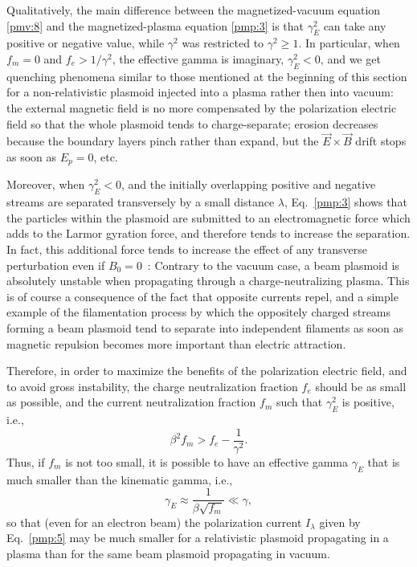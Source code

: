 \documentclass [12pt,a4paper,     ]{report} %
\begin{document}
   Qualitatively, the main difference between the magnetized-vacuum equation \eqref{pmv:8} and the magnetized-plasma equation \eqref{pmp:3} is that  $\gamma^2_E$ can take any positive or negative value, while $\gamma^2$ was restricted to $\gamma^2 \geq 1$.  In particular, when $f_m=0$ and $f_e > 1/\gamma^2$, the effective gamma is imaginary, $\gamma^2_E < 0$, and we get  quenching phenomena similar to those mentioned at the beginning of this section for a non-relativistic plasmoid injected into a plasma rather then into vacuum: the external magnetic field is no more compensated by the polarization electric field so that the whole plasmoid tends to charge-separate; erosion decreases because the boundary layers pinch rather than expand, but the $\vec E \times \vec B$ drift stops as soon as $E_p=0$, etc.


    Moreover, when $\gamma^2_E < 0$, and the initially overlapping positive and negative streams are separated transversely by a small distance $\lambda$, Eq.~\eqref{pmp:3} shows that the particles within the plasmoid are submitted to an electromagnetic force which adds to the Larmor gyration force, and therefore tends to increase the separation. In fact, this additional force tends to increase the effect of any transverse perturbation even if $B_0 = 0$~: Contrary to the vacuum case, a beam plasmoid is absolutely unstable when propagating through a charge-neutralizing plasma.  This is of course a consequence of the fact that opposite currents repel, and a simple example of the filamentation process by which the oppositely charged streams forming a beam plasmoid tend to separate into independent filaments as soon as magnetic repulsion becomes more important than electric attraction.


  Therefore, in order to maximize the benefits of the polarization electric field, and to avoid gross instability, the charge neutralization fraction $f_e$ should be as small as possible, and the current neutralization fraction $f_m$ such that $\gamma^2_E$ is positive, i.e.,
%
\begin{equation}\label{pmp:6} 
        \beta^2 f_m  > f_e  - \frac{1}{\gamma^2}.
\end{equation}
%
Thus, if $f_m$ is not too small, it is possible to have an effective gamma $\gamma_E$ that is much smaller than the kinematic gamma, i.e.,
%
\begin{equation}\label{pmp:7} 
        \gamma_E \approx \frac{1}{\beta \sqrt{f_m}}  \ll \gamma,
\end{equation}
%
so that (even for an electron beam) the polarization current $I_{\lambda}$ given by Eq.~\eqref{pmp:5} may be much smaller for a relativistic plasmoid propagating in a plasma than for the same beam plasmoid propagating in vacuum.
\end{document}
